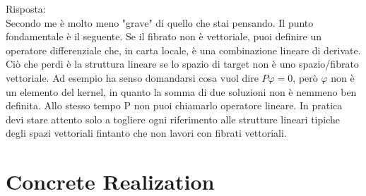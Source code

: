 \documentclass[Main]{subfiles}
\begin{document}
\begin{Warning}
			\vspace{3mm}
			Risposta:\\
			Secondo me è molto meno "grave" di quello che stai pensando. 
			Il punto fondamentale è il seguente. Se il fibrato non è vettoriale, puoi definire un operatore differenziale che, in carta locale, è una combinazione lineare di derivate. 
			Ciò che perdi è la struttura lineare se lo spazio di target non è uno spazio/fibrato vettoriale. 
			Ad esempio ha senso domandarsi cosa vuol dire $P\varphi = 0$, però $\varphi$ non è un elemento del kernel, in quanto la somma di due soluzioni non è nemmeno ben definita. Allo stesso tempo P non puoi chiamarlo operatore lineare. In pratica devi stare attento solo a togliere ogni riferimento alle strutture lineari tipiche degli spazi vettoriali fintanto che non lavori con fibrati vettoriali.
	\end{Warning}

	\section{Concrete Realization}
\end{document}
